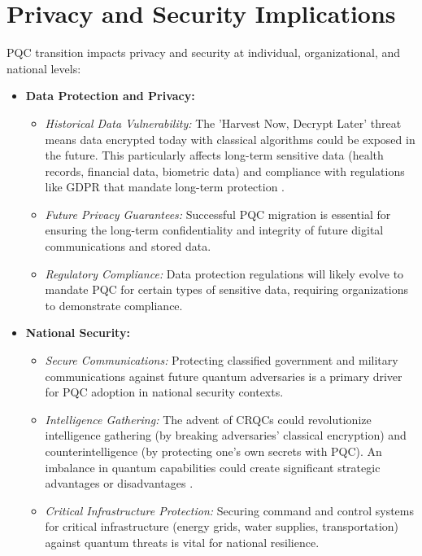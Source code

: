 \section{Privacy and Security Implications}\label{sec:privacy_ch9}

PQC transition impacts privacy and security at individual, organizational, and national levels:

\begin{itemize}
    \item \textbf{Data Protection and Privacy:}
    \begin{itemize}
        \item \textit{Historical Data Vulnerability:} The 'Harvest Now, Decrypt Later' threat means data encrypted today with classical algorithms could be exposed in the future. This particularly affects long-term sensitive data (health records, financial data, biometric data) and compliance with regulations like GDPR that mandate long-term protection \parencite{gdpr_pqc_implications}.
        \item \textit{Future Privacy Guarantees:} Successful PQC migration is essential for ensuring the long-term confidentiality and integrity of future digital communications and stored data.
        \item \textit{Regulatory Compliance:} Data protection regulations will likely evolve to mandate PQC for certain types of sensitive data, requiring organizations to demonstrate compliance.
    \end{itemize}
    \item \textbf{National Security:}
    \begin{itemize}
        \item \textit{Secure Communications:} Protecting classified government and military communications against future quantum adversaries is a primary driver for PQC adoption in national security contexts.
        \item \textit{Intelligence Gathering:} The advent of CRQCs could revolutionize intelligence gathering (by breaking adversaries' classical encryption) and counterintelligence (by protecting one's own secrets with PQC). An imbalance in quantum capabilities could create significant strategic advantages or disadvantages \parencite{quantum_natsec_implications}.
        \item \textit{Critical Infrastructure Protection:} Securing command and control systems for critical infrastructure (energy grids, water supplies, transportation) against quantum threats is vital for national resilience.
    \end{itemize}
\end{itemize}


